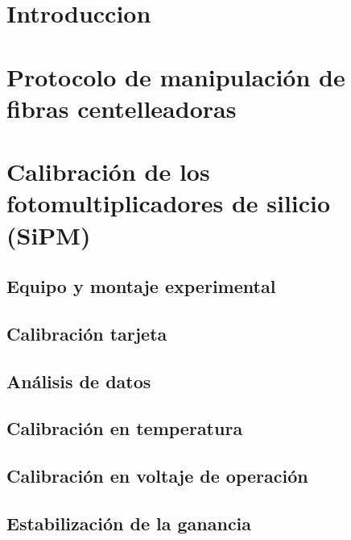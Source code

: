 \documentclass[11pt,a4paper]{article}
\begin{document}

%

\tableofcontents
\newpage


\section{Introduccion}  \label{sec:ch01}


\newpage
\section{Protocolo de manipulación de fibras centelleadoras} \label{sec:ch03}


\newpage
\section{Calibración de los fotomultiplicadores de silicio (SiPM)} \label{sec:ch02}

	\subsection{Equipo y montaje experimental}
	
	
	\subsection{Calibración tarjeta}
	
	
	\subsection{Análisis de datos}
	
	
	\subsection{Calibración en temperatura}
	

	\subsection{Calibración en voltaje de operación}
	
	
	\subsection{Estabilización de la ganancia}
	
\end{document}
